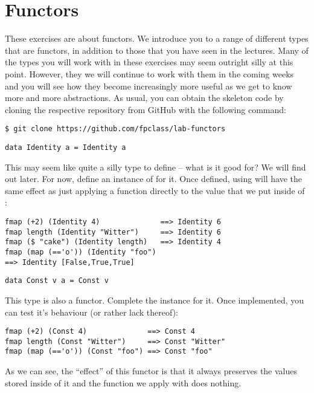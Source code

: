 \section{Functors}

These exercises are about functors. We introduce you to a range of different types that are functors, in addition to those that you have seen in the lectures. Many of the types you will work with in these exercises may seem outright silly at this point. However, they we will continue to work with them in the coming weeks and you will see how they become increasingly more useful as we get to know more and more abstractions. As usual, you can obtain the skeleton code by cloning the respective repository from GitHub with the following command:
\begin{verbatim}
$ git clone https://github.com/fpclass/lab-functors
\end{verbatim}

\taskLine

\begin{verbatim}
data Identity a = Identity a
\end{verbatim}
This may seem like quite a silly type to define -- what is it good for? We will find out later. For now, define an instance of  for it. Once defined, using  will have the same effect as just applying a function directly to the value that we put inside of :
\begin{verbatim}
fmap (+2) (Identity 4)              ==> Identity 6
fmap length (Identity "Witter")     ==> Identity 6
fmap ($ "cake") (Identity length)   ==> Identity 4
fmap (map (=='o')) (Identity "foo") 
==> Identity [False,True,True]
\end{verbatim} 


\taskLine 

\begin{verbatim}
data Const v a = Const v
\end{verbatim}
This type is also a functor. Complete the  instance for it. Once implemented, you can test it's behaviour (or rather lack thereof):
\begin{verbatim}
fmap (+2) (Const 4)              ==> Const 4
fmap length (Const "Witter")     ==> Const "Witter"
fmap (map (=='o')) (Const "foo") ==> Const "foo"
\end{verbatim} 
As we can see, the ``effect'' of this functor is that it always preserves the values stored inside of it and the function we apply with  does nothing. 

